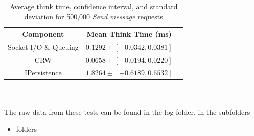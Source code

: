 \documentclass{article}
\begin{document}
                \begin{table}[H]
                    \begin{tabular}{|c|c|c|}
                        \hline 
                        \textbf{Component} & \textbf{Mean Think Time} (ms)\\ 
                        \hline 
                        Socket I/O \& Queuing & $0.1292\pm [-0.0342 , 0.0381]$\\ 
                        \hline 
                        CRW & $0.0658\pm [-0.0194 , 0.0220]$\\ 
                        \hline 
                        IPersistence &$1.8264\pm [-0.6189 , 0.6532]$\\ 
                        \hline 
                    \end{tabular}
                    \caption{Average think time, confidence interval, and standard deviation for 500,000 \textit{Send message} requests}
                    \label{table:thinktime_500k_push}
                \end{table} 
                ~\\
                \\
                The raw data from these tests can be found in the log-folder, in the subfolders
                \begin{itemize}
                    \item folders
                \end{itemize}
\end{document}
